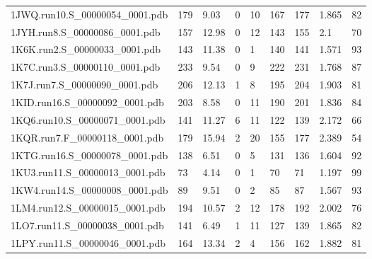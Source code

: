 \documentclass{bioinfo}
\begin{document}
\begin{table}[!t]
{\begin{tabular}{lllllllll}
    1JWQ.run10.S\_00000054\_0001.pdb & 179      & 9.03       & 0           & 10          & 167         & 177     & 1.865           & 82           \\
    1JYH.run8.S\_00000086\_0001.pdb & 157      & 12.98      & 0           & 12          & 143         & 155     & 2.1             & 70           \\
    1K6K.run2.S\_00000033\_0001.pdb & 143      & 11.38      & 0           & 1           & 140         & 141     & 1.571           & 93           \\
    1K7C.run3.S\_00000110\_0001.pdb & 233      & 9.54       & 0           & 9           & 222         & 231     & 1.768           & 87           \\
    1K7J.run7.S\_00000090\_0001.pdb & 206      & 12.13      & 1           & 8           & 195         & 204     & 1.903           & 81           \\
    1KID.run16.S\_00000092\_0001.pdb & 203      & 8.58       & 0           & 11          & 190         & 201     & 1.836           & 84           \\
    1KQ6.run10.S\_00000071\_0001.pdb & 141      & 11.27      & 6           & 11          & 122         & 139     & 2.172           & 66           \\
    1KQR.run7.F\_00000118\_0001.pdb & 179      & 15.94      & 2           & 20          & 155         & 177     & 2.389           & 54           \\
    1KTG.run16.S\_00000078\_0001.pdb & 138      & 6.51       & 0           & 5           & 131         & 136     & 1.604           & 92           \\
    1KU3.run11.S\_00000013\_0001.pdb & 73       & 4.14       & 0           & 1           & 70          & 71      & 1.197           & 99           \\
    1KW4.run14.S\_00000008\_0001.pdb & 89       & 9.51       & 0           & 2           & 85          & 87      & 1.567           & 93           \\
    1LM4.run12.S\_00000015\_0001.pdb & 194      & 10.57      & 2           & 12          & 178         & 192     & 2.002           & 76           \\
    1LO7.run11.S\_00000038\_0001.pdb & 141      & 6.49       & 1           & 11          & 127         & 139     & 1.865           & 82           \\
    1LPY.run11.S\_00000046\_0001.pdb & 164      & 13.34      & 2           & 4           & 156         & 162     & 1.882           & 81           \\

\end{tabular}}
\end{table}
\end{document}
